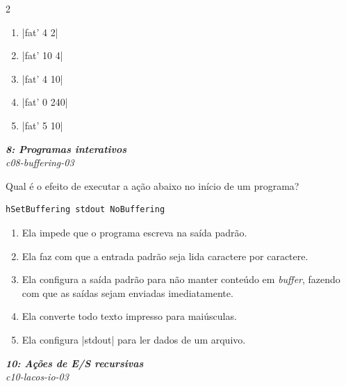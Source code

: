 \documentclass[a4paper,10pt,brazil]{article}
\begin{document}
\begin{multicols}{2}
\begin{enumerate}
  \item \haskellinline|fat' 4 2|

  \item \haskellinline|fat' 10 4|

  \item \haskellinline|fat' 4 10|

  \item \haskellinline|fat' 0 240|

  \item \haskellinline|fat' 5 10|


\end{enumerate}

\begin{flushright}
  \footnotesize
  \textit{\textbf{8: Programas interativos}}\\
  \textit{c08-buffering-03}\\

\end{flushright}
Qual é o efeito de executar a ação abaixo no início de um programa?

\begin{verbatim}
hSetBuffering stdout NoBuffering
\end{verbatim}

\begin{enumerate}
  \item Ela impede que o programa escreva na saída padrão.

  \item Ela faz com que a entrada padrão seja lida caractere por caractere.

  \item Ela configura a saída padrão para não manter conteúdo em \emph{buffer}, fazendo com que as saídas sejam enviadas imediatamente.

  \item Ela converte todo texto impresso para maiúsculas.

  \item Ela configura \haskellinline|stdout| para ler dados de um arquivo.


\end{enumerate}

\begin{flushright}
  \footnotesize
  \textit{\textbf{10: Ações de E/S recursivas}}\\
  \textit{c10-lacos-io-03}\\


\end{flushright}
\end{multicols}
\end{document}
